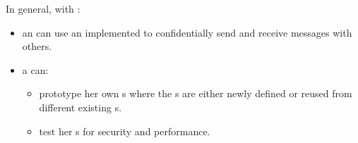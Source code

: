 In general, with \cry:
\begin{itemize}
\item an \eu{} can use an implemented \cs{}
  to confidentially send and receive messages with others.
\item a \cg{} can:
  \begin{itemize}
  \item prototype her own \cs s
    where the \ca s are either newly defined
    or reused from different existing \cs s.
  \item test her \cs s for security and performance.
  \end{itemize}
\end{itemize}
